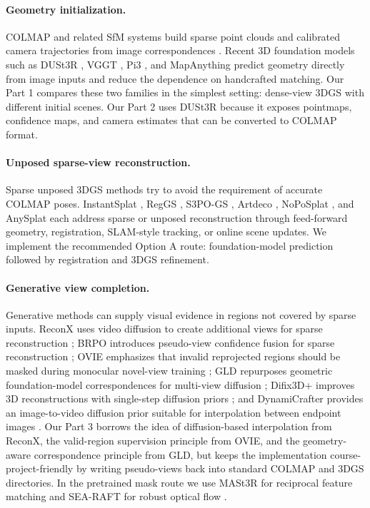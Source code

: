 \documentclass[10pt,twocolumn,letterpaper]{article}
\begin{document}
\paragraph{Geometry initialization.}
COLMAP and related SfM systems build sparse point clouds and calibrated camera trajectories from image correspondences \cite{agarwal2011building}.  Recent 3D foundation models such as DUSt3R \cite{wang2024dust3r}, VGGT \cite{wang2025vggt}, Pi3 \cite{wang2025pi3}, and MapAnything \cite{keetha2025mapanything} predict geometry directly from image inputs and reduce the dependence on handcrafted matching.  Our Part 1 compares these two families in the simplest setting: dense-view 3DGS with different initial scenes.  Our Part 2 uses DUSt3R because it exposes pointmaps, confidence maps, and camera estimates that can be converted to COLMAP format.

\paragraph{Unposed sparse-view reconstruction.}
Sparse unposed 3DGS methods try to avoid the requirement of accurate COLMAP poses.  InstantSplat \cite{fan2024instantsplat}, RegGS \cite{cheng2025reggs}, S3PO-GS \cite{cheng2025s3po}, Artdeco \cite{li2025artdeco}, NoPoSplat \cite{ye2024nopose}, and AnySplat \cite{jiang2025anysplat} each address sparse or unposed reconstruction through feed-forward geometry, registration, SLAM-style tracking, or online scene updates.  We implement the recommended Option A route: foundation-model prediction followed by registration and 3DGS refinement.

\paragraph{Generative view completion.}
Generative methods can supply visual evidence in regions not covered by sparse inputs.  ReconX uses video diffusion to create additional views for sparse reconstruction \cite{liu2024reconx}; BRPO introduces pseudo-view confidence fusion for sparse reconstruction \cite{zhao2026brpo}; OVIE emphasizes that invalid reprojected regions should be masked during monocular novel-view training \cite{ovie2026}; GLD repurposes geometric foundation-model correspondences for multi-view diffusion \cite{gld2026}; Difix3D+ improves 3D reconstructions with single-step diffusion priors \cite{wu2025difix3d}; and DynamiCrafter provides an image-to-video diffusion prior suitable for interpolation between endpoint images \cite{xing2024dynamicrafter}.  Our Part 3 borrows the idea of diffusion-based interpolation from ReconX, the valid-region supervision principle from OVIE, and the geometry-aware correspondence principle from GLD, but keeps the implementation course-project-friendly by writing pseudo-views back into standard COLMAP and 3DGS directories.  In the pretrained mask route we use MASt3R for reciprocal feature matching \cite{leroy2024mast3r} and SEA-RAFT for robust optical flow \cite{wang2024searaft}.
\end{document}
